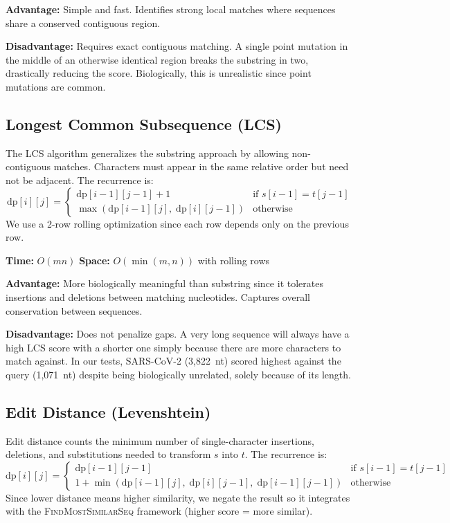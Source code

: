 \documentclass{article}
\begin{document}
\textbf{Advantage:} Simple and fast. Identifies strong local matches where sequences share a conserved contiguous region.

\textbf{Disadvantage:} Requires exact contiguous matching. A single point mutation in the middle of an otherwise identical region breaks the substring in two, drastically reducing the score. Biologically, this is unrealistic since point mutations are common.

\subsection{Longest Common Subsequence (LCS)}

The LCS algorithm generalizes the substring approach by allowing non-contiguous matches. Characters must appear in the same relative order but need not be adjacent. The recurrence is:
\[
\text{dp}[i][j] = 
\begin{cases}
\text{dp}[i{-}1][j{-}1] + 1 & \text{if } s[i{-}1] = t[j{-}1] \\
\max(\text{dp}[i{-}1][j],\; \text{dp}[i][j{-}1]) & \text{otherwise}
\end{cases}
\]
We use a 2-row rolling optimization since each row depends only on the previous row.

\textbf{Time:} $O(mn)$ \quad \textbf{Space:} $O(\min(m, n))$ with rolling rows

\textbf{Advantage:} More biologically meaningful than substring since it tolerates insertions and deletions between matching nucleotides. Captures overall conservation between sequences.

\textbf{Disadvantage:} Does not penalize gaps. A very long sequence will always have a high LCS score with a shorter one simply because there are more characters to match against. In our tests, SARS-CoV-2 (3,822~nt) scored highest against the query (1,071~nt) despite being biologically unrelated, solely because of its length.

\subsection{Edit Distance (Levenshtein)}

Edit distance counts the minimum number of single-character insertions, deletions, and substitutions needed to transform $s$ into $t$. The recurrence is:
\[
\text{dp}[i][j] = 
\begin{cases}
\text{dp}[i{-}1][j{-}1] & \text{if } s[i{-}1] = t[j{-}1] \\
1 + \min(\text{dp}[i{-}1][j],\; \text{dp}[i][j{-}1],\; \text{dp}[i{-}1][j{-}1]) & \text{otherwise}
\end{cases}
\]
Since lower distance means higher similarity, we negate the result so it integrates with the \textsc{FindMostSimilarSeq} framework (higher score = more similar).
\end{document}
